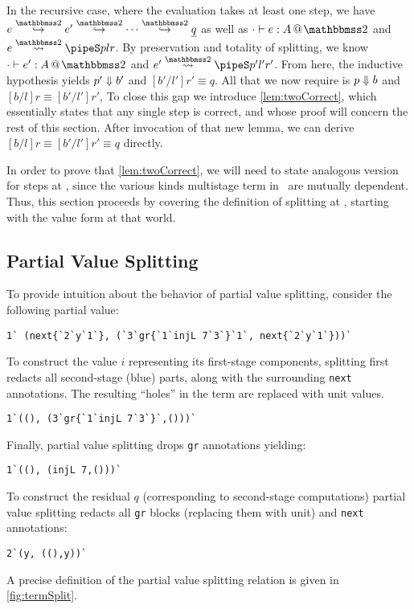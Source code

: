 \begin{abstrsyn}
In the recursive case, where the evaluation takes at least one step, we have 
$e \stepsym \bbtwo e' \stepsym \bbtwo \cdots \stepsym \bbtwo \exv q$
as well as \mbox{$\typestwo [\cdot] e A$} 
and \mbox{$\splittwo e A p l r$}.
By preservation and totality of splitting, we know $\typestwo [\cdot] {e'} A$ and $\splittwo {e'} A {p'} {l'} {r'}$.
From here, the inductive hypothesis yields ${p'} \Downarrow {b'}$ and $[b'/l']r' \equiv q$.
All that we now require is ${p} \Downarrow {b}$ and $[b/l]r \equiv [b'/l']r'$,
To close this gap we introduce \ref{lem:twoCorrect}, 
which essentially states that any single step is correct,
and whose proof will concern the rest of this section.
After invocation of that new lemma, we can derive $[b/l]r \equiv [b'/l']r' \equiv q$ directly.

In order to prove that \ref{lem:twoCorrect},
we will need to state analogous version for steps at \bbonem,
since the various kinds multistage term in \lang\ are mutually dependent.
Thus, this section proceeds by covering the definition of splitting at \bbonem, 
starting with the value form at that world.

\subsection{Partial Value Splitting}
\label{sec:masking}

To provide intuition about the behavior of partial value splitting, consider the
following partial value:
\begin{lstlisting}
1` (next{`2`y`1`}, (`3`gr{`1`injL 7`3`}`1`, next{`2`y`1`}))`
\end{lstlisting}
To construct the value $i$ representing its first-stage components,
splitting first redacts all second-stage (blue) parts, along with the
surrounding \texttt{next} annotations. 
The resulting ``holes'' in the term are replaced with
unit values.
\begin{lstlisting}
1`((), (3`gr{`1`injL 7`3`}`,()))`
\end{lstlisting}
Finally, partial value splitting drops \texttt{gr} annotations yielding:
\begin{lstlisting}
1`((), (injL 7,()))`
\end{lstlisting}
To construct the residual $q$ (corresponding to second-stage computations) partial value splitting redacts all \texttt{gr} blocks
(replacing them with unit) and \texttt{next} annotations:
\begin{lstlisting}
2`(y, ((),y))`
\end{lstlisting}
A precise definition of the partial value splitting relation is given in
\ref{fig:termSplit}.


\end{abstrsyn}
